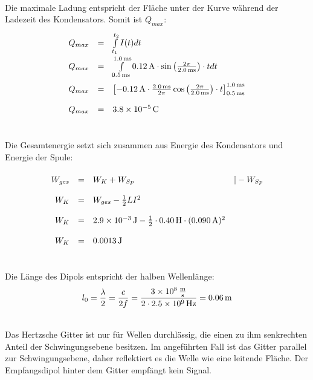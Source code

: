 \documentclass[a4paper]{article}
\begin{document}
\\
Die maximale Ladung entspricht der Fläche unter der Kurve während der Ladezeit des Kondensators. Somit ist $Q_{max}$:
$$
\renewcommand{\arraystretch}{2}
\begin{array}{rcll}
Q_{max} &=& \int\limits_{t_1}^{t_2}I(t)dt\\
Q_{max} &=& \int\limits_{\SI{0,5}{\milli\second}}^{\SI{1,0}{\milli\second}}\SI{0,12}{\ampere} \cdot \sin{\left({2\pi \over \SI{2,0}{\milli\second}}\right) \cdot t}dt \\
Q_{max} &=& \left[\SI{-0,12}{\ampere} \cdot{\SI{2,0}{\milli\second}\over 2\pi} \cos{\left(2\pi \over \SI{2,0}{\milli\second}\right)\cdot t} \right]_{\SI{0,5}{\milli\second}}^{\SI{1,0}{\milli\second}}\\
Q_{max} &=& \SI{3,8e-5}{\coulomb}
\end{array}
$$  
\vspace{0.5 cm}

\\
Die Gesamtenergie setzt sich zusammen aus Energie des Kondensators und Energie der Spule:
$$ 
\renewcommand{\arraystretch}{2}
\begin{array}{rcll}
W_{ges} & = & W_{K} + W_{Sp} &| - W_{Sp}\\
W_{K}   & = & W_{ges}-  {1 \over 2} LI^2\\
W_{K}   & = & \SI{2,9e-3}{\joule}  - {1 \over 2}\cdot \SI{0,40}{\henry} \cdot (\SI{0,090}{\ampere})^2\\
W_{K}   & = & \SI{0,0013}{\joule}
\end{array}
$$  
\vspace{0.5 cm}

\\
Die Länge des Dipols entspricht der halben Wellenlänge:
$$l_0 = {\lambda \over 2} = {c \over 2 f} = {\SI{3e8}{\meter\over \second}\over 2\cdot \SI{2,5e9}{\hertz}} = \SI{0,06}{\meter} $$
\vspace{0.5 cm}

\\
Das Hertzsche Gitter ist nur für Wellen durchlässig, die einen zu ihm senkrechten Anteil der Schwingungsebene besitzen. Im angeführten Fall ist das Gitter parallel zur Schwingungsebene, daher reflektiert es die Welle wie eine leitende Fläche. Der Empfangsdipol hinter dem Gitter empfängt kein Signal.
\vspace{0.5 cm}
\end{document}
